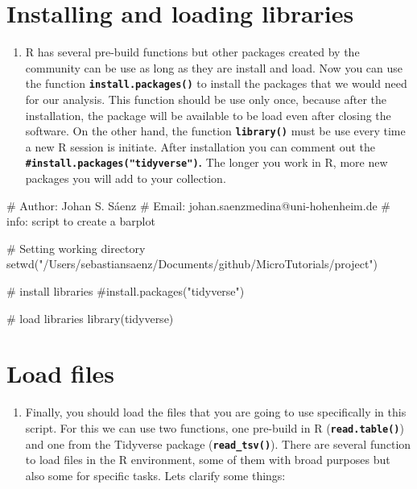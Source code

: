\documentclass[
  letterpaper,
  DIV=11,
  numbers=noendperiod]{scrartcl}
\newenvironment{Shaded}{\begin{snugshade}}{\end{snugshade}}
\newcommand{\CommentTok}[1]{\textcolor[rgb]{0.37,0.37,0.37}{#1}}
\newcommand{\FunctionTok}[1]{\textcolor[rgb]{0.28,0.35,0.67}{#1}}
\newcommand{\NormalTok}[1]{\textcolor[rgb]{0.00,0.23,0.31}{#1}}
\newcommand{\StringTok}[1]{\textcolor[rgb]{0.13,0.47,0.30}{#1}}
\providecommand{\tightlist}{%
  \setlength{\itemsep}{0pt}\setlength{\parskip}{0pt}}\usepackage{longtable,booktabs,array}
\begin{document}
\hypertarget{installing-and-loading-libraries}{%
\section{Installing and loading
libraries}\label{installing-and-loading-libraries}}

\begin{enumerate}
\def\labelenumi{\arabic{enumi}.}
\setcounter{enumi}{5}
\tightlist
\item
  R has several pre-build functions but other packages created by the
  community can be use as long as they are install and load. Now you can
  use the function \textbf{\texttt{install.packages()}} to install the
  packages that we would need for our analysis. This function should be
  use only once, because after the installation, the package will be
  available to be load even after closing the software. On the other
  hand, the function \textbf{\texttt{library()}} must be use every time
  a new R session is initiate. After installation you can comment out
  the \textbf{\texttt{\#install.packages("tidyverse")}.} The longer you
  work in R, more new packages you will add to your collection.
\end{enumerate}

\begin{Shaded}
\begin{Highlighting}[]
\CommentTok{\# Author: Johan S. Sáenz}
\CommentTok{\# Email: johan.saenzmedina@uni{-}hohenheim.de}
\CommentTok{\# info: script to create a barplot}

\CommentTok{\# Setting working directory}
\FunctionTok{setwd}\NormalTok{(}\StringTok{"/Users/sebastiansaenz/Documents/github/MicroTutorials/project"}\NormalTok{)}

\CommentTok{\# install libraries}
\CommentTok{\#install.packages("tidyverse")}

\CommentTok{\# load libraries}
\FunctionTok{library}\NormalTok{(tidyverse)}
\end{Highlighting}
\end{Shaded}

\hypertarget{load-files}{%
\section{Load files}\label{load-files}}

\begin{enumerate}
\def\labelenumi{\arabic{enumi}.}
\setcounter{enumi}{6}
\tightlist
\item
  Finally, you should load the files that you are going to use
  specifically in this script. For this we can use two functions, one
  pre-build in R (\textbf{\texttt{read.table()}}) and one from the
  Tidyverse package (\textbf{\texttt{read\_tsv()}}). There are several
  function to load files in the R environment, some of them with broad
  purposes but also some for specific tasks. Lets clarify some things:
\end{enumerate}
\end{document}
